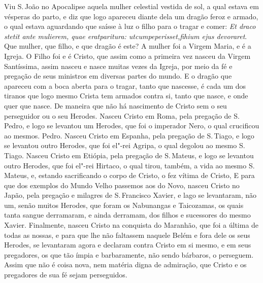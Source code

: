 Viu S.\,João no Apocalipse aquela mulher celestial vestida de sol, a qual
estava em vésperas do parto, e diz que logo apareceu diante dela um
dragão feroz e armado, o qual estava aguardando que saísse à luz o filho
para o tragar e comer: \emph{Et draco stetit ante mulierem, quae
eratparitura: utcumpeperisset,fihium ejus devoraret}. Que
mulher, que filho, e que dragão é este? A mulher foi a Virgem Maria, e é
a Igreja. O Filho foi e é Cristo, que assim como a primeira vez nasceu
da Virgem Santíssima, assim nasceu e nasce muitas vezes da Igreja, por
meio da fé e pregação de seus ministros em diversas partes do mundo. E o
dragão que apareceu com a boca aberta para o tragar, tanto que nascesse,
é cada um dos tiranos que logo mesmo Crista tem armados contra si, tanto
que nasce, e onde quer que nasce. De maneira que não há nascimento de
Cristo sem o seu perseguidor ou o seu Herodes. Nasceu Cristo em Roma,
pela pregação de S.\,Pedro, e logo se levantou um Herodes, que foi o
imperador Nero, o qual crucificou ao mesmos. Pedro. Nasceu Cristo em
Espanha, pela pregação de S.\,Tiago, e logo se levantou outro Herodes,
que foi el"-rei Agripa, o qual degolou ao mesmo S.\,Tiago.
Nasceu Cristo em Etiópia, pela pregação de S.\,Mateus, e logo se levantou
outro Herodes, que foi el"-rei Hirtaco, o qual tirou, também, a vida ao
mesmo S.\,Mateus, e, estando sacrificando o corpo de Cristo, o fez vítima
de Cristo, E para que dos exemplos do Mundo Velho passemos aos do Novo,
nasceu Cristo no Japão, pela pregação e milagres de S.\,Francisco Xavier,
e lago se levantaram, não um, senão muitos Herodes, que foram os
Nabunangas e Taicozamas, os quais tanta sangue derramaram, e ainda
derramam, dos filhos e sucessores do mesmo Xavier. Finalmente, nasceu
Cristo na conquista do Maranhão, que foi a última de todas as nossas, e
para que lhe não faltassem naquele Belém e fora dele os seus Herodes, se
levantaram agora e declaram contra Cristo em si mesmo, e em seus
pregadores, os que tão ímpia e barbaramente, não sendo bárbaros, o
perseguem. Assim que não é coisa nova, nem matéria digna de admiração,
que Cristo e os pregadores de sua fé sejam perseguidos.

